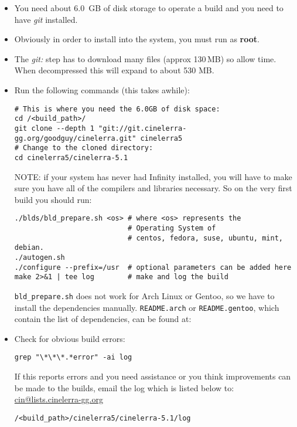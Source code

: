 \begin{itemize}
\item You need about 6.0 \,GB of disk storage to operate a build and
  you need to have \textit{git} installed.

\item Obviously in order to install into the system, you must run as
  \textbf{root}.

\item The \textit{git:} step has to download many files (approx
  130\,MB) so allow time. When decompressed this will expand to
  about 530 MB.

\item Run the following commands (this takes awhile):

\begin{lstlisting}[style=sh]
# This is where you need the 6.0GB of disk space:
cd /<build_path>/
git clone --depth 1 "git://git.cinelerra-gg.org/goodguy/cinelerra.git" cinelerra5
# Change to the cloned directory:
cd cinelerra5/cinelerra-5.1
\end{lstlisting}
  NOTE: if your system has never had \CGG{} Infinity installed, you
  will have to make sure you have all of the compilers and libraries
  necessary.  So on the very first build you should run:

\begin{lstlisting}[style=sh]
./blds/bld_prepare.sh <os> # where <os> represents the
                           # Operating System of
                           # centos, fedora, suse, ubuntu, mint, debian.
./autogen.sh
./configure --prefix=/usr  # optional parameters can be added here
make 2>&1 | tee log        # make and log the build
\end{lstlisting}

  \texttt{bld\_prepare.sh} does not work for Arch Linux or Gentoo,
  so we have to install the dependencies
  manually. \texttt{README.arch} or \texttt{README.gentoo}, which
  contain the list of dependencies, can be found at:

\item Check for obvious build errors:
\begin{lstlisting}[style=sh]
grep "\*\*\*.*error" -ai log
\end{lstlisting}
  If this reports errors and you need assistance or you think
  improvements can be made to the builds, email the log which is
  listed below to:
  \href{mailto:cin@lists.cinelerra-gg.org}{cin@lists.cinelerra-gg.org}
\begin{lstlisting}[style=sh]
/<build_path>/cinelerra5/cinelerra-5.1/log
\end{lstlisting}


\end{itemize}
